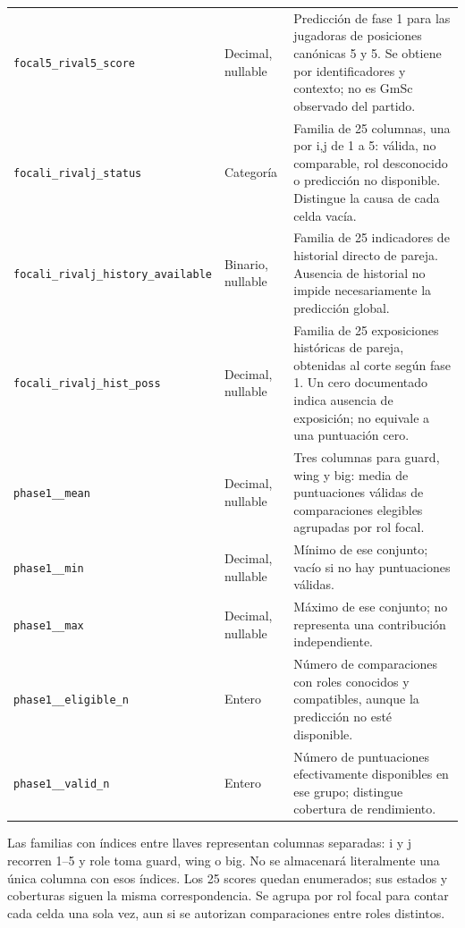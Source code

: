 \begin{longtable}{@{}>{\raggedright\arraybackslash}p{5.0cm}>{\raggedright\arraybackslash}p{1.9cm}>{\raggedright\arraybackslash}p{7.7cm}@{}}
\texttt{focal5\_\allowbreak rival5\_\allowbreak score} & Decimal, nullable & Predicción de fase 1 para las jugadoras de posiciones canónicas 5 y 5. Se obtiene por identificadores y contexto; no es GmSc observado del partido.\\
\texttt{focal{i}\_\allowbreak rival{j}\_\allowbreak status} & Categoría & Familia de 25 columnas, una por i,j de 1 a 5: válida, no comparable, rol desconocido o predicción no disponible. Distingue la causa de cada celda vacía.\\
\texttt{focal{i}\_\allowbreak rival{j}\_\allowbreak history\_\allowbreak available} & Binario, nullable & Familia de 25 indicadores de historial directo de pareja. Ausencia de historial no impide necesariamente la predicción global.\\
\texttt{focal{i}\_\allowbreak rival{j}\_\allowbreak hist\_\allowbreak poss} & Decimal, nullable & Familia de 25 exposiciones históricas de pareja, obtenidas al corte según fase 1. Un cero documentado indica ausencia de exposición; no equivale a una puntuación cero.\\
\texttt{phase1\_\allowbreak {role}\_\allowbreak mean} & Decimal, nullable & Tres columnas para guard, wing y big: media de puntuaciones válidas de comparaciones elegibles agrupadas por rol focal.\\
\texttt{phase1\_\allowbreak {role}\_\allowbreak min} & Decimal, nullable & Mínimo de ese conjunto; vacío si no hay puntuaciones válidas.\\
\texttt{phase1\_\allowbreak {role}\_\allowbreak max} & Decimal, nullable & Máximo de ese conjunto; no representa una contribución independiente.\\
\texttt{phase1\_\allowbreak {role}\_\allowbreak eligible\_\allowbreak n} & Entero & Número de comparaciones con roles conocidos y compatibles, aunque la predicción no esté disponible.\\
\texttt{phase1\_\allowbreak {role}\_\allowbreak valid\_\allowbreak n} & Entero & Número de puntuaciones efectivamente disponibles en ese grupo; distingue cobertura de rendimiento.\\
\end{longtable}
\endgroup

Las familias con índices entre llaves representan columnas separadas: i y j recorren 1--5 y role toma guard, wing o big. No se almacenará literalmente una única columna con esos índices. Los 25 scores quedan enumerados; sus estados y coberturas siguen la misma correspondencia. Se agrupa por rol focal para contar cada celda una sola vez, aun si se autorizan comparaciones entre roles distintos.

